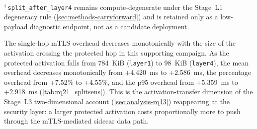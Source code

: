 \begin{table}[ht]
\centering
\caption[Stage~H1 single-hop mTLS overhead by split point]{Stage~H1 split-sensitivity: single-hop mTLS overhead as a function of the activation crossing the protected hop. Each row is a paired plain/mTLS pair at one split point, aggregated over five interleaved passes (1{,}000 measured iterations per condition). Source: \texttt{merged/split\_sensitivity\_summary.csv} and \texttt{merged/aggregated\_results.csv} in \texttt{rq2\_1\_mtls\_split\_20260516\_095406}. As documented in the evidence manifest, these per-split deltas are internally comparable within this interleaved campaign and must not be spliced into the frozen two-condition \texttt{chain\_2svc} or \texttt{chain\_5svc} paired results.}
\label{tab:rq21_splitsens}
\\[2pt]
{\footnotesize $^{\dagger}$\,\texttt{split\_after\_layer4} remains compute-degenerate under the Stage~L1 degeneracy rule (\cref{sec:methods-carryforward}) and is retained only as a low-payload diagnostic endpoint, not as a candidate deployment.}
\end{table}

The single-hop mTLS overhead decreases monotonically with the size of the activation
crossing the protected hop in this supporting campaign. As the protected activation falls from 784~KiB
(\texttt{layer1}) to 98~KiB (\texttt{layer4}), the mean overhead decreases
monotonically from +4.420~ms to +2.586~ms, the percentage overhead from +7.52\%
to +4.55\%, and the p95 overhead from +5.359~ms to +2.918~ms
(\cref{tab:rq21_splitsens}). This is the activation-transfer dimension of the
Stage~L3 two-dimensional account (\cref{sec:analysis-rq13}) reappearing at the
security layer: a larger protected activation costs proportionally more to push
through the mTLS-mediated sidecar data path.

